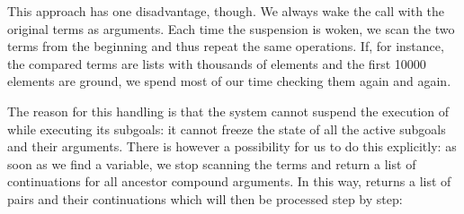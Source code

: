 This approach has one disadvantage, though.
We always wake the  call with the
original terms
as arguments.
Each time the suspension is woken, we scan the two terms
from the beginning and thus repeat the same operations.
If, for instance, the compared terms are lists with thousands of elements
and the first 10000 elements are ground, we spend most of our time
checking them again and again.

The reason for this handling is that the system cannot suspend
the execution of  while executing
its subgoals:
it cannot freeze the state of all the active subgoals and their
arguments.
There is however a possibility for us to do this explicitly:
as soon as we find a variable, we stop scanning the terms
and return a list of continuations for all ancestor compound arguments.
In this way,  returns a list of pairs
and their continuations which will then be processed step by step:
